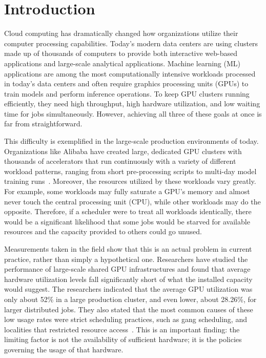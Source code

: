 \chapter{Introduction}\label{chp:intro}



Cloud computing has dramatically changed how organizations utilize their computer processing capabilities. Today's modern data centers are using clusters made up of thousands of computers to provide both interactive web-based applications and large-scale analytical applications. Machine learning (ML) applications are among the most computationally intensive workloads processed in today's data centers and often require graphics processing units (GPUs) to train models and perform inference operations. To keep GPU clusters running efficiently, they need high throughput, high hardware utilization, and low waiting time for jobs simultaneously. However, achieving all three of these goals at once is far from straightforward.

This difficulty is exemplified in the large-scale production environments of today. Organizations like Alibaba have created large, dedicated GPU clusters with thousands of accelerators that run continuously with a variety of different workload patterns, ranging from short pre-processing scripts to multi-day model training runs~\cite{weng2022mlaas}. Moreover, the resources utilized by these workloads vary greatly. For example, some workloads may fully saturate a GPU's memory and almost never touch the central processing unit (CPU), while other workloads may do the opposite. Therefore, if a scheduler were to treat all workloads identically, there would be a significant likelihood that some jobs would be starved for available resources and the capacity provided to others could go unused.

Measurements taken in the field show that this is an actual problem in current practice, rather than simply a hypothetical one. Researchers have studied the performance of large-scale shared GPU infrastructures and found that average hardware utilization levels fall significantly short of what the installed capacity would suggest. The researchers indicated that the average GPU utilization was only about 52\% in a large production cluster, and even lower, about 28.26\%, for larger distributed jobs. They also stated that the most common causes of these low usage rates were strict scheduling practices, such as gang scheduling, and localities that restricted resource access~\cite{jeon2019analysis}. This is an important finding: the limiting factor is not the availability of sufficient hardware; it is the policies governing the usage of that hardware.

